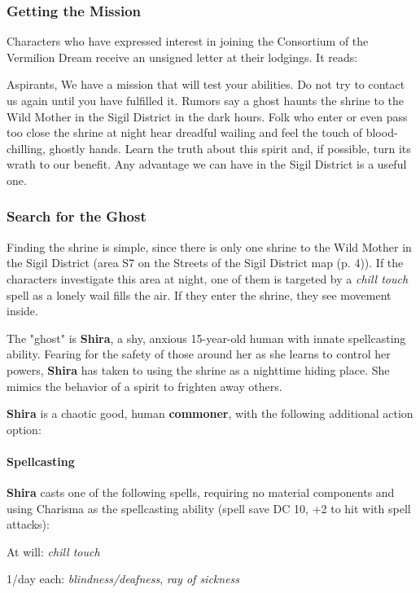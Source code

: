\documentclass[letterpaper, 11pt, bg=full, twocolumn]{dndbook}
\begin{document}
\subsubsection{Getting the Mission}

Characters who have expressed interest in joining the Consortium of the Vermilion Dream receive an unsigned letter at their lodgings. It reads:

\begin{DndReadAloud}
Aspirants,
We have a mission that will test your abilities. Do not try to contact us again until you have fulfilled it.
Rumors say a ghost haunts the shrine to the Wild Mother in the Sigil District in the dark hours. Folk who enter or even pass too close the shrine at night hear dreadful wailing and feel the touch of blood-chilling, ghostly hands.
Learn the truth about this spirit and, if possible, turn its wrath to our benefit. Any advantage we can have in the Sigil District is a useful one.
\end{DndReadAloud}

\subsubsection{Search for the Ghost}

Finding the shrine is simple, since there is only one shrine to the Wild Mother in the Sigil District (area S7 on the Streets of the Sigil District map (p. 4)). If the characters investigate this area at night, one of them is targeted by a \textit{chill touch} spell as a lonely wail fills the air. If they enter the shrine, they see movement inside.

The "ghost" is \textbf{Shira}, a shy, anxious 15-year-old human with innate spellcasting ability. Fearing for the safety of those around her as she learns to control her powers, \textbf{Shira} has taken to using the shrine as a nighttime hiding place. She mimics the behavior of a spirit to frighten away others.

\textbf{Shira} is a chaotic good, human \textbf{commoner}, with the following additional action option:

\begin{DndSidebar}{}
\paragraph{Spellcasting}

\textbf{Shira} casts one of the following spells, requiring no material components and using Charisma as the spellcasting ability (spell save DC 10, +2 to hit with spell attacks):

At will: \textit{chill touch}

1/day each: \textit{blindness/deafness}, \textit{ray of sickness}
\end{DndSidebar}
\end{document}
